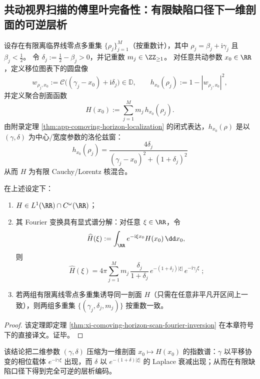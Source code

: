 \subsection{共动视界扫描的傅里叶完备性：有限缺陷口径下一维剖面的可逆层析}\label{subsec:cdim-comoving-horizon-scan-fourier-completeness}
设存在有限离临界线零点多重集 \(\{\rho_j\}_{j=1}^{M}\)（按重数计），其中
\(\rho_j=\beta_j+\mathrm{i}\gamma_j\) 且 \(\beta_j<\tfrac12\)。
令 \(\delta_j:=\tfrac12-\beta_j>0\)，并记重数 \(m_j\in\ZZ_{\ge 1}\)。
对任意共动参数 \(x_0\in\RR\)，定义移位图表下的圆盘像
\[
w_{\rho_j,x_0}:=\mathcal{C}\!\bigl((\gamma_j-x_0)+\mathrm{i}\delta_j\bigr)\in\mathbb{D},
\qquad
h_{x_0}(\rho_j):=1-|w_{\rho_j,x_0}|^2,
\]
并定义聚合剖面函数
\[
H(x_0):=\sum_{j=1}^{M}m_j\,h_{x_0}(\rho_j).
\]
由附录定理 \ref{thm:app-comoving-horizon-localization} 的闭式表达，\(h_{x_0}(\rho)\) 是以 \((\gamma,\delta)\) 为中心/宽度参数的洛伦兹窗：
\[
\boxed{\;
h_{x_0}(\rho_j)=\frac{4\delta_j}{(\gamma_j-x_0)^2+(1+\delta_j)^2}\;}
\]
从而 \(H\) 为有限 Cauchy/Lorentz 核混合。

\begin{theorem}\label{thm:cdim-comoving-horizon-scan-fourier-inversion}
在上述设定下：
\begin{enumerate}
  \item \(H\in L^1(\RR)\cap C^\omega(\RR)\)；
  \item 其 Fourier 变换具有显式谱分解：对任意 \(\xi\in\RR\)，令
  \[
  \widehat H(\xi):=\int_{\RR}e^{-\mathrm{i}\xi x_0}H(x_0)\,\dd x_0,
  \]
  则
  \[
  \boxed{\;
  \widehat H(\xi)
  =4\pi\sum_{j=1}^{M}m_j\,\frac{\delta_j}{1+\delta_j}\,e^{-(1+\delta_j)|\xi|}\,e^{-\mathrm{i}\gamma_j\xi}\; } ;
  \]
  \item 若两组有限离线零点多重集诱导同一剖面 \(H\)（只需在任意非平凡开区间上一致），则两组多重集 \(\{(\gamma_j,\delta_j,m_j)\}\) 按重数一致。
\end{enumerate}
\end{theorem}
\begin{proof}
该定理即定理 \ref{thm:xi-comoving-horizon-scan-fourier-inversion} 在本章符号下的直接译文。证毕。
\end{proof}
该结论把二维参数 \((\gamma,\delta)\) 压缩为一维剖面 \(x_0\mapsto H(x_0)\) 的指数谱：\(\gamma\) 以平移协变的相位载体 \(e^{-\mathrm{i}\gamma\xi}\) 出现，而 \(\delta\) 以 \(e^{-(1+\delta)|\xi|}\) 的 Laplace 衰减出现；从而在有限缺陷口径下得到完全可逆的层析编码。

